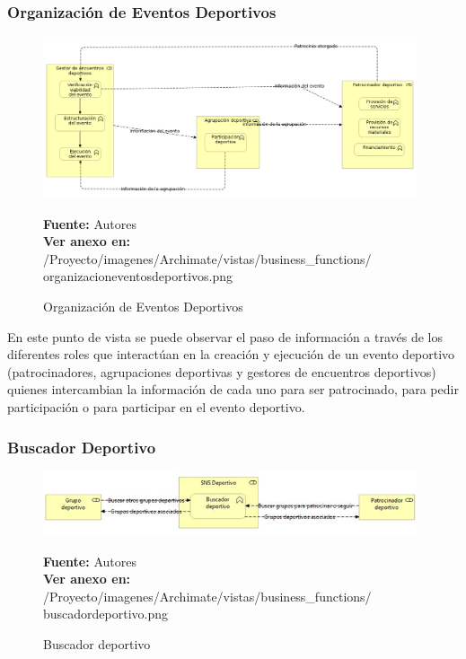 \subsubsection{Organización de Eventos Deportivos}

\begin{figure}[!htb]
  \begin{center}
    \includegraphics[width=11cm]{./imagenes/Archimate/vistas/business_functions/organizacioneventosdeportivos.png}
    \caption{Organización de Eventos Deportivos}
    \label{fig:bf_organizacion_eventos_deportivos}
    \textbf{Fuente:}  Autores \\
    \textbf{Ver anexo en:} /Proyecto/imagenes/Archimate/vistas/business\_functions/
    organizacioneventosdeportivos.png
  \end{center}
\end{figure}

En este punto de vista se puede observar el paso de información a través de los diferentes roles que interactúan en la creación y ejecución de un evento deportivo (patrocinadores, agrupaciones deportivas y gestores de encuentros deportivos) quienes intercambian la información de cada uno para ser patrocinado, para pedir participación o para participar en el evento deportivo.

\subsubsection{Buscador Deportivo}

\begin{figure}[!htb]
  \begin{center}
    \includegraphics[width=11cm]{./imagenes/Archimate/vistas/business_functions/buscadordeportivo.png}
    \caption{Buscador deportivo}
    \label{fig:BF_BuscadorDeportivo}
    \textbf{Fuente:}  Autores \\
    \textbf{Ver anexo en:} /Proyecto/imagenes/Archimate/vistas/business\_functions/
    buscadordeportivo.png
  \end{center}
\end{figure}

